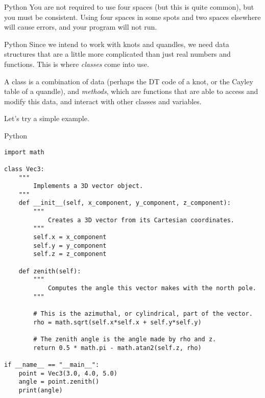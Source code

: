 \documentclass{beamer}
\begin{document}
    \begin{frame}{Python}
        You are not required to use four spaces (but this is quite common),
        but you must be consistent. Using four spaces in some spots and
        two spaces elsewhere will cause errors, and your program will not run.
    \end{frame}
    \begin{frame}{Python}
        Since we intend to work with knots and quandles, we need data
        structures that are a little more complicated than just real numbers
        and functions. This is where \textit{classes} come into use.
        \par\hfill\par
        A class is a combination of data (perhaps the DT code of a knot, or
        the Cayley table of a quandle), and \textit{methods}, which are
        functions that are able to access and modify this data, and interact
        with other classes and variables.
        \par\hfill\par
        Let's try a simple example.
    \end{frame}
    \begin{frame}[fragile]{Python}
        \begin{adjustbox}{width=0.5\textwidth,keepaspectratio}
            \begin{lstlisting}
import math

class Vec3:
    """
        Implements a 3D vector object.
    """
    def __init__(self, x_component, y_component, z_component):
        """
            Creates a 3D vector from its Cartesian coordinates.
        """
        self.x = x_component
        self.y = y_component
        self.z = z_component

    def zenith(self):
        """
            Computes the angle this vector makes with the north pole.
        """

        # This is the azimuthal, or cylindrical, part of the vector.
        rho = math.sqrt(self.x*self.x + self.y*self.y)

        # The zenith angle is the angle made by rho and z.
        return 0.5 * math.pi - math.atan2(self.z, rho)

if __name__ == "__main__":
    point = Vec3(3.0, 4.0, 5.0)
    angle = point.zenith()
    print(angle)
            \end{lstlisting}
        \end{adjustbox}
    \end{frame}
\end{document}

